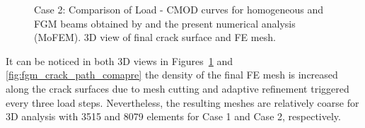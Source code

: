 \documentclass[onecolumn]{svjour3}
\begin{document}
% 
\begin{figure}
	\centering
	\caption{Case 2: Comparison of Load - CMOD curves for homogeneous and FGM beams obtained by \citep{kim2004simulation} and the present numerical analysis (MoFEM). 3D view of final crack surface and FE mesh.}
	\label{fig:fgm_case2}
\end{figure}

It can be noticed in both 3D views in Figures~\ref{fig:fgm_case2} and \ref{fig:fgm_crack_path_comapre} the density of the final FE mesh is increased along the crack surfaces due to mesh cutting and adaptive refinement triggered every three load steps. Nevertheless, the resulting meshes are relatively coarse for 3D analysis with 3515 and 8079 elements for Case 1 and Case 2, respectively.
% 
\end{document}
